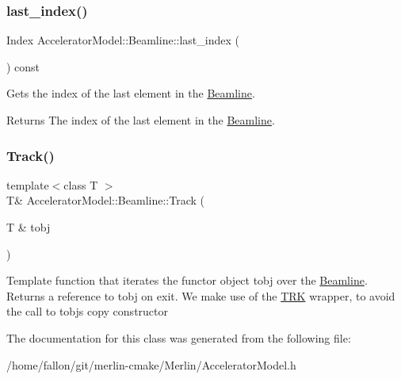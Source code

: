 \subsubsection{\texorpdfstring{last\+\_\+index()}{last\_index()}}
{\footnotesize\ttfamily Index Accelerator\+Model\+::\+Beamline\+::last\+\_\+index (\begin{DoxyParamCaption}{ }\end{DoxyParamCaption}) const\hspace{0.3cm}{\ttfamily [inline]}}

Gets the index of the last element in the \hyperlink{classAcceleratorModel_1_1Beamline}{Beamline}. \begin{DoxyReturn}{Returns}
The index of the last element in the \hyperlink{classAcceleratorModel_1_1Beamline}{Beamline}. 
\end{DoxyReturn}
\mbox{\label{classAcceleratorModel_1_1Beamline_af48fc0105707f1b09e5b343ffa829854}} 
\subsubsection{\texorpdfstring{Track()}{Track()}}
{\footnotesize\ttfamily template$<$class T $>$ \\
T\& Accelerator\+Model\+::\+Beamline\+::\+Track (\begin{DoxyParamCaption}\item[{T \&}]{tobj }\end{DoxyParamCaption})\hspace{0.3cm}{\ttfamily [inline]}}

Template function that iterates the functor object tobj over the \hyperlink{classAcceleratorModel_1_1Beamline}{Beamline}. Returns a reference to tobj on exit. We make use of the \hyperlink{classAcceleratorModel_1_1Beamline_1_1TRK}{T\+RK} wrapper, to avoid the call to tobj\textquotesingle{}s copy constructor

The documentation for this class was generated from the following file\+:\begin{DoxyCompactItemize}
\item 
/home/fallon/git/merlin-\/cmake/\+Merlin/Accelerator\+Model.\+h\end{DoxyCompactItemize}

